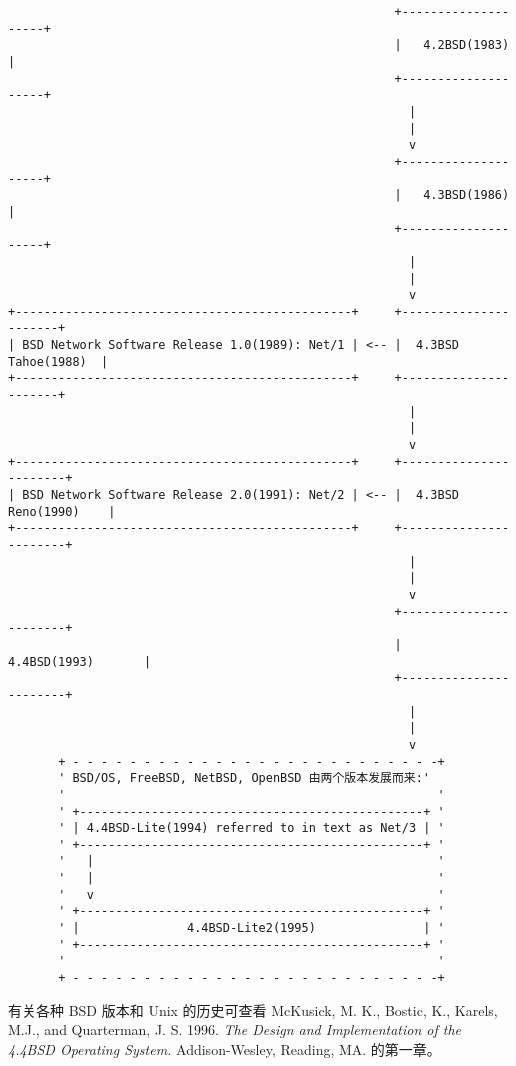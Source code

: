     \begin{verbatim}
                                                      +--------------------+
                                                      |   4.2BSD(1983)     |
                                                      +--------------------+
                                                        |
                                                        |
                                                        v
                                                      +--------------------+
                                                      |   4.3BSD(1986)     |
                                                      +--------------------+
                                                        |
                                                        |
                                                        v
+-----------------------------------------------+     +----------------------+
| BSD Network Software Release 1.0(1989): Net/1 | <-- |  4.3BSD Tahoe(1988)  |
+-----------------------------------------------+     +----------------------+
                                                        |
                                                        |
                                                        v
+-----------------------------------------------+     +-----------------------+
| BSD Network Software Release 2.0(1991): Net/2 | <-- |  4.3BSD Reno(1990)    |
+-----------------------------------------------+     +-----------------------+
                                                        |
                                                        |
                                                        v
                                                      +-----------------------+
                                                      |    4.4BSD(1993)       |
                                                      +-----------------------+
                                                        |
                                                        |
                                                        v
       + - - - - - - - - - - - - - - - - - - - - - - - - - -+
       ' BSD/OS, FreeBSD, NetBSD, OpenBSD 由两个版本发展而来:'
       '                                                    '
       ' +------------------------------------------------+ '
       ' | 4.4BSD-Lite(1994) referred to in text as Net/3 | '
       ' +------------------------------------------------+ '
       '   |                                                '
       '   |                                                '
       '   v                                                '
       ' +------------------------------------------------+ '
       ' |               4.4BSD-Lite2(1995)               | '
       ' +------------------------------------------------+ '
       '                                                    '
       + - - - - - - - - - - - - - - - - - - - - - - - - - -+
    \end{verbatim}

    有关各种 BSD 版本和 Unix 的历史可查看 McKusick, M. K., Bostic, K., Karels, M.J., and Quarterman, J. S. 1996. \textit{The Design and Implementation of the 4.4BSD Operating System.} Addison-Wesley, Reading, MA. 的第一章。
